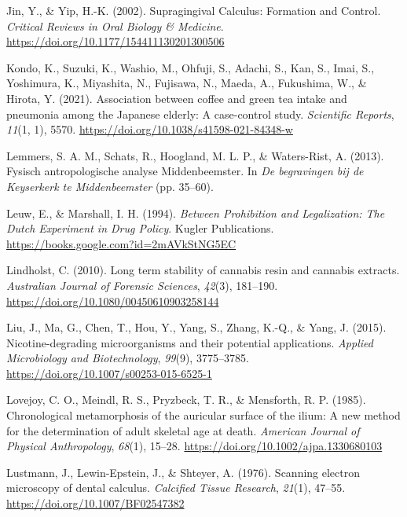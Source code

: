 \documentclass[
]{article}
\newlength{\cslhangindent}
\newlength{\cslentryspacingunit} %
\newenvironment{CSLReferences}[2] %
 {%
  \setlength{\parindent}{0pt}
  \ifodd #1
  \let\oldpar\par
  \def\par{\hangindent=\cslhangindent\oldpar}
  \fi
  \setlength{\parskip}{#2\cslentryspacingunit}
 }%
 {}
\begin{document}
\begin{CSLReferences}{1}{0}
\leavevmode{}%
Jin, Y., \& Yip, H.-K. (2002). Supragingival {Calculus}: {Formation} and
{Control}. \emph{Critical Reviews in Oral Biology \& Medicine}.
\url{https://doi.org/10.1177/154411130201300506}

\leavevmode{}%
Kondo, K., Suzuki, K., Washio, M., Ohfuji, S., Adachi, S., Kan, S.,
Imai, S., Yoshimura, K., Miyashita, N., Fujisawa, N., Maeda, A.,
Fukushima, W., \& Hirota, Y. (2021). Association between coffee and
green tea intake and pneumonia among the {Japanese} elderly: A
case-control study. \emph{Scientific Reports}, \emph{11}(1, 1), 5570.
\url{https://doi.org/10.1038/s41598-021-84348-w}

\leavevmode{}%
Lemmers, S. A. M., Schats, R., Hoogland, M. L. P., \& Waters-Rist, A.
(2013). Fysisch antropologische analyse Middenbeemster. In \emph{De
begravingen bij de Keyserkerk te Middenbeemster} (pp. 35--60).

\leavevmode{}%
Leuw, E., \& Marshall, I. H. (1994). \emph{Between {Prohibition} and
{Legalization}: {The Dutch Experiment} in {Drug Policy}}. {Kugler
Publications}. \url{https://books.google.com?id=2mAVkStNG5EC}

\leavevmode{}%
Lindholst, C. (2010). Long term stability of cannabis resin and cannabis
extracts. \emph{Australian Journal of Forensic Sciences}, \emph{42}(3),
181--190. \url{https://doi.org/10.1080/00450610903258144}

\leavevmode{}%
Liu, J., Ma, G., Chen, T., Hou, Y., Yang, S., Zhang, K.-Q., \& Yang, J.
(2015). Nicotine-degrading microorganisms and their potential
applications. \emph{Applied Microbiology and Biotechnology},
\emph{99}(9), 3775--3785.
\url{https://doi.org/10.1007/s00253-015-6525-1}

\leavevmode{}%
Lovejoy, C. O., Meindl, R. S., Pryzbeck, T. R., \& Mensforth, R. P.
(1985). Chronological metamorphosis of the auricular surface of the
ilium: {A} new method for the determination of adult skeletal age at
death. \emph{American Journal of Physical Anthropology}, \emph{68}(1),
15--28. \url{https://doi.org/10.1002/ajpa.1330680103}

\leavevmode{}%
Lustmann, J., Lewin-Epstein, J., \& Shteyer, A. (1976). Scanning
electron microscopy of dental calculus. \emph{Calcified Tissue
Research}, \emph{21}(1), 47--55.
\url{https://doi.org/10.1007/BF02547382}


\end{CSLReferences}
\end{document}
